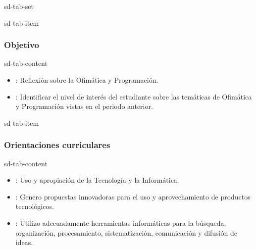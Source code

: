 \documentclass[letterpaper,10pt,spanish]{sphinxmanual}
\begin{document}
\begin{sphinxuseclass}{sd-tab-set}
\begin{sphinxuseclass}{sd-tab-item}\subsubsection*{Objetivo}

\begin{sphinxuseclass}{sd-tab-content}
\sphinxAtStartPar
{}
\begin{itemize}
\item {} 
\sphinxAtStartPar
{}: Reflexión sobre la Ofimática y Programación.

\item {} 
\sphinxAtStartPar
{}: Identificar el nivel de interés del estudiante sobre las temáticas de Ofimática y Programación vistas en el periodo anterior.

\end{itemize}

\end{sphinxuseclass}
\end{sphinxuseclass}
\begin{sphinxuseclass}{sd-tab-item}\subsubsection*{Orientaciones curriculares}

\begin{sphinxuseclass}{sd-tab-content}\begin{itemize}
\item {} 
\sphinxAtStartPar
{}: Uso y apropiación de la Tecnología y la Informática.

\item {} 
\sphinxAtStartPar
{}: Genero propuestas innovadoras para el uso y aprovechamiento de productos tecnológicos.

\item {} 
\sphinxAtStartPar
{}: Utilizo adecuadamente herramientas informáticas para la búsqueda, organización, procesamiento, sistematización, comunicación y difusión de ideas.


\end{itemize}
\end{sphinxuseclass}
\end{sphinxuseclass}
\end{sphinxuseclass}
\end{document}
